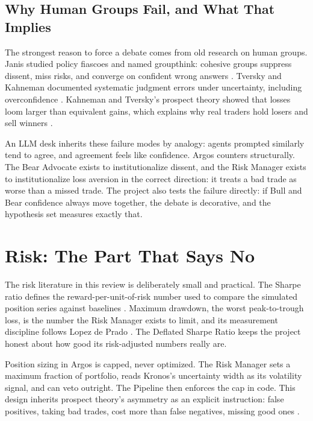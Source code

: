 \documentclass[conference]{IEEEtran}
\newcommand{\sys}{Argos}
\begin{document}
\subsection{Why Human Groups Fail, and What That Implies}

The strongest reason to force a debate comes from old research on human groups. Janis studied policy fiascoes and named groupthink: cohesive groups suppress dissent, miss risks, and converge on confident wrong answers \cite{janis1972groupthink}. Tversky and Kahneman documented systematic judgment errors under uncertainty, including overconfidence \cite{tversky1974judgment}. Kahneman and Tversky's prospect theory showed that losses loom larger than equivalent gains, which explains why real traders hold losers and sell winners \cite{kahneman1979prospect}.

An LLM desk inherits these failure modes by analogy: agents prompted similarly tend to agree, and agreement feels like confidence. \sys{} counters structurally. The Bear Advocate exists to institutionalize dissent, and the Risk Manager exists to institutionalize loss aversion in the correct direction: it treats a bad trade as worse than a missed trade. The project also tests the failure directly: if Bull and Bear confidence always move together, the debate is decorative, and the hypothesis set measures exactly that.

\section{Risk: The Part That Says No}
\label{sec:risk}

The risk literature in this review is deliberately small and practical. The Sharpe ratio defines the reward-per-unit-of-risk number used to compare the simulated position series against baselines \cite{sharpe1994sharpe}. Maximum drawdown, the worst peak-to-trough loss, is the number the Risk Manager exists to limit, and its measurement discipline follows Lopez de Prado \cite{lopezdeprado2018advances}. The Deflated Sharpe Ratio \cite{bailey2014deflated} keeps the project honest about how good its risk-adjusted numbers really are.

Position sizing in \sys{} is capped, never optimized. The Risk Manager sets a maximum fraction of portfolio, reads Kronos's uncertainty width as its volatility signal, and can veto outright. The Pipeline then enforces the cap in code. This design inherits prospect theory's asymmetry as an explicit instruction: false positives, taking bad trades, cost more than false negatives, missing good ones \cite{kahneman1979prospect}.
\end{document}
